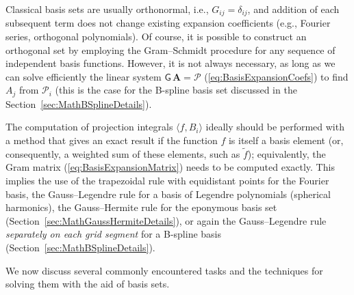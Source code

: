 \documentclass[12pt]{article}
\begin{document}
Classical basis sets are usually orthonormal, i.e., $G_{ij} = \delta_{ij}$, and addition of each subsequent term does not change existing expansion coefficients (e.g., Fourier series, orthogonal polynomials). Of course, it is possible to construct an orthogonal set by employing the Gram--Schmidt procedure for any sequence of independent basis functions. However, it is not always necessary, as long as we can solve efficiently the linear system $\mathsf G\,\boldsymbol A = \boldsymbol{\mathcal P}$ (\ref{eq:BasisExpansionCoefs}) to find $A_j$ from $\mathcal P_i$ (this is the case for the B-spline basis set discussed in the Section~\ref{sec:MathBSplineDetails}).

The computation of projection integrals $\langle f, B_i\rangle$ ideally should be performed with a method that gives an exact result if the function $f$ is itself a basis element (or, consequently, a weighted sum of these elements, such as $\tilde f$); equivalently, the Gram matrix (\ref{eq:BasisExpansionMatrix}) needs to be computed exactly. This implies the use of the trapezoidal rule with equidistant points for the Fourier basis, the Gauss--Legendre rule for a basis of Legendre polynomials (spherical harmonics), the Gauss--Hermite rule for the eponymous basis set  (Section~\ref{sec:MathGaussHermiteDetails}), or again the Gauss--Legendre rule \textit{separately on each grid segment} for a B-spline basis (Section~\ref{sec:MathBSplineDetails}).

We now discuss several commonly encountered tasks and the techniques for solving them with the aid of basis sets.
\end{document}
